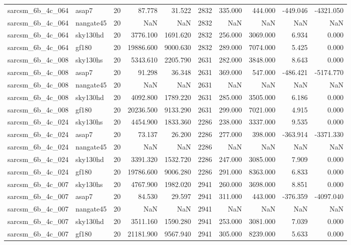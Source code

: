\begin{longtable}{llrrrrrrrr}
sarcsm\_6b\_4c\_064 & asap7 & 20 & 87.778 & 31.522 & 2832 & 335.000 & 444.000 & -449.046 & -4321.050 \\
sarcsm\_6b\_4c\_064 & nangate45 & 20 & NaN & NaN & 2832 & NaN & NaN & NaN & NaN \\
sarcsm\_6b\_4c\_064 & sky130hd & 20 & 3776.100 & 1691.620 & 2832 & 256.000 & 3069.000 & 6.934 & 0.000 \\
sarcsm\_6b\_4c\_064 & gf180 & 20 & 19886.600 & 9000.630 & 2832 & 289.000 & 7074.000 & 5.425 & 0.000 \\
sarcsm\_6b\_4c\_008 & sky130hs & 20 & 5343.610 & 2205.790 & 2631 & 282.000 & 3848.000 & 8.643 & 0.000 \\
sarcsm\_6b\_4c\_008 & asap7 & 20 & 91.298 & 36.348 & 2631 & 369.000 & 547.000 & -486.421 & -5174.770 \\
sarcsm\_6b\_4c\_008 & nangate45 & 20 & NaN & NaN & 2631 & NaN & NaN & NaN & NaN \\
sarcsm\_6b\_4c\_008 & sky130hd & 20 & 4092.800 & 1789.220 & 2631 & 285.000 & 3505.000 & 6.186 & 0.000 \\
sarcsm\_6b\_4c\_008 & gf180 & 20 & 20236.500 & 9133.290 & 2631 & 299.000 & 7021.000 & 4.915 & 0.000 \\
sarcsm\_6b\_4c\_024 & sky130hs & 20 & 4454.900 & 1833.360 & 2286 & 238.000 & 3337.000 & 9.535 & 0.000 \\
sarcsm\_6b\_4c\_024 & asap7 & 20 & 73.137 & 26.200 & 2286 & 277.000 & 398.000 & -363.914 & -3371.330 \\
sarcsm\_6b\_4c\_024 & nangate45 & 20 & NaN & NaN & 2286 & NaN & NaN & NaN & NaN \\
sarcsm\_6b\_4c\_024 & sky130hd & 20 & 3391.320 & 1532.720 & 2286 & 247.000 & 3085.000 & 7.909 & 0.000 \\
sarcsm\_6b\_4c\_024 & gf180 & 20 & 19786.600 & 9006.280 & 2286 & 291.000 & 8363.000 & 6.833 & 0.000 \\
sarcsm\_6b\_4c\_007 & sky130hs & 20 & 4767.900 & 1982.020 & 2941 & 260.000 & 3698.000 & 8.851 & 0.000 \\
sarcsm\_6b\_4c\_007 & asap7 & 20 & 84.530 & 29.597 & 2941 & 311.000 & 443.000 & -376.359 & -4097.040 \\
sarcsm\_6b\_4c\_007 & nangate45 & 20 & NaN & NaN & 2941 & NaN & NaN & NaN & NaN \\
sarcsm\_6b\_4c\_007 & sky130hd & 20 & 3511.160 & 1590.280 & 2941 & 253.000 & 3081.000 & 7.039 & 0.000 \\
sarcsm\_6b\_4c\_007 & gf180 & 20 & 21181.900 & 9567.940 & 2941 & 305.000 & 8239.000 & 5.633 & 0.000 \\

\end{longtable}
